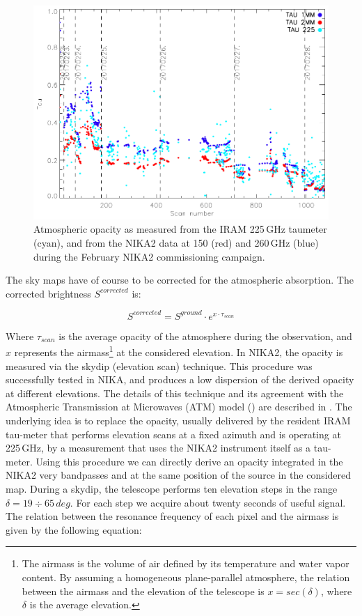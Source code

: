 \documentclass[]{aa} %
\begin{document}
\begin{figure}
\includegraphics[scale=0.55]{./opacity_evol_run22.pdf}
\caption{Atmospheric opacity as measured from the IRAM 225\,GHz taumeter (cyan), and from the NIKA2 data at 150 (red) and 260\,GHz (blue) during the February NIKA2 commissioning campaign. \label{fig:taumeas}}
\end{figure}

The sky maps have of course to be corrected for the atmospheric absorption. The corrected brightness $S^{corrected}$ is:

\begin{equation}
S^{corrected} =  S^{ground} \cdot e^{ x \cdot \tau_{scan}}
\end{equation}

Where $\tau_{scan}$ is the average opacity of the atmosphere during the
observation, and $x$ represents the airmass\footnote{The airmass is the volume
  of air defined by its temperature and water vapor content. By assuming a
  homogeneous plane-parallel atmosphere, the relation between the airmass and
  the elevation of the telescope is $x = sec(\delta)$, where $\delta$ is the
  average elevation.} at the considered elevation.  In NIKA2, the opacity is
measured via the skydip (elevation scan) technique. This procedure was
successfully tested in NIKA, and produces a low dispersion of the derived
opacity at different elevations. The details of this technique and its agreement
with the Atmospheric Transmission at Microwaves (ATM) model
(\cite{2001IEEE....49.1683C}) are described in \cite{Catalano2014}. The
underlying idea is to replace the opacity, usually delivered by the resident
IRAM tau-meter that performs elevation scans at a fixed azimuth and is operating
at 225\,GHz, by a measurement that uses the NIKA2 instrument itself as a
tau-meter. Using this procedure we can directly derive an opacity integrated in
the NIKA2 very bandpasses and at the same position of the source in the
considered map.  During a skydip, the telescope performs ten elevation steps in
the range $\delta = 19\div65\,deg$. For each step we acquire about twenty
seconds of useful signal. The relation between the resonance frequency of each
pixel and the airmass is given by the following equation:
\end{document}
